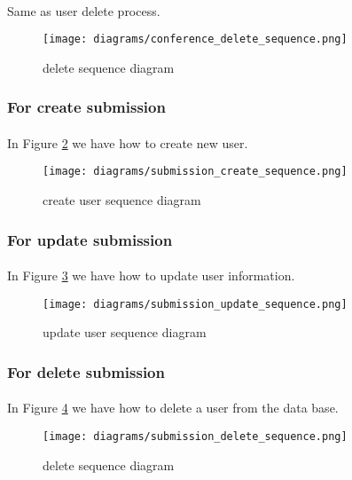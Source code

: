 	\paragraph{}
	Same as user delete process.
	
		\begin{figure}[!ht]
			\centering
			\texttt{[image: diagrams/conference\_delete\_sequence.png]}
			\caption{delete sequence diagram}
			\label{fig:conference-delete-s-d}
		\end{figure}
	
	\subsubsection{For create submission}
	\paragraph{}
	In Figure \ref{fig:submission-create-s-d} we have how to create new user.
	
		\begin{figure}[!ht]
			\centering
			\texttt{[image: diagrams/submission\_create\_sequence.png]}
			\caption{create user sequence diagram}
			\label{fig:submission-create-s-d}
		\end{figure}
	
	\subsubsection{For update submission}
	\paragraph{}
	In Figure \ref{fig:submission-update-s-d} we have how to update user information.
	
		\begin{figure}[!ht]
			\centering
			\texttt{[image: diagrams/submission\_update\_sequence.png]}
			\caption{update user sequence diagram}
			\label{fig:submission-update-s-d}
		\end{figure}
	
	\subsubsection{For delete submission}
	\paragraph{}
	In Figure \ref{fig:submission-delete-s-d} we have how to delete a user from the data base.
	
		\begin{figure}[!ht]
			\centering
			\texttt{[image: diagrams/submission\_delete\_sequence.png]}
			\caption{delete sequence diagram}
			\label{fig:submission-delete-s-d}
		\end{figure}